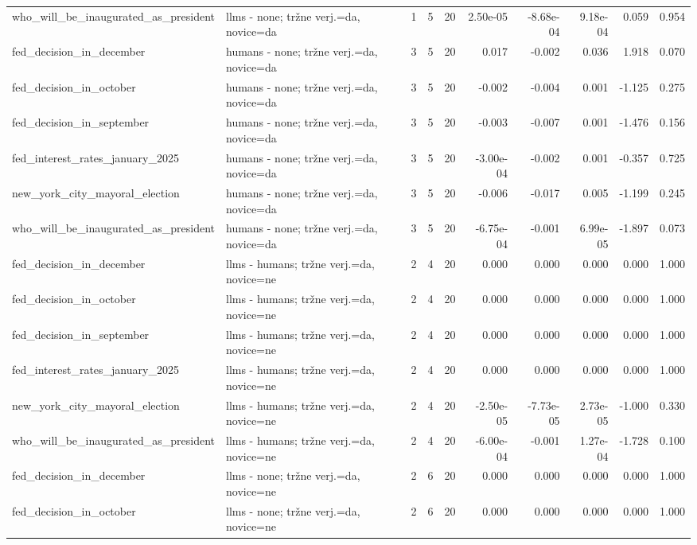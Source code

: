 \begin{longtable}{llrrrrrrrr}
who\_will\_be\_inaugurated\_as\_president & llms - none; tržne verj.=da, novice=da & 1 & 5 & 20 & 2.50e-05 & -8.68e-04 & 9.18e-04 & 0.059 & 0.954 \\
fed\_decision\_in\_december & humans - none; tržne verj.=da, novice=da & 3 & 5 & 20 & 0.017 & -0.002 & 0.036 & 1.918 & 0.070 \\
fed\_decision\_in\_october & humans - none; tržne verj.=da, novice=da & 3 & 5 & 20 & -0.002 & -0.004 & 0.001 & -1.125 & 0.275 \\
fed\_decision\_in\_september & humans - none; tržne verj.=da, novice=da & 3 & 5 & 20 & -0.003 & -0.007 & 0.001 & -1.476 & 0.156 \\
fed\_interest\_rates\_january\_2025 & humans - none; tržne verj.=da, novice=da & 3 & 5 & 20 & -3.00e-04 & -0.002 & 0.001 & -0.357 & 0.725 \\
new\_york\_city\_mayoral\_election & humans - none; tržne verj.=da, novice=da & 3 & 5 & 20 & -0.006 & -0.017 & 0.005 & -1.199 & 0.245 \\
who\_will\_be\_inaugurated\_as\_president & humans - none; tržne verj.=da, novice=da & 3 & 5 & 20 & -6.75e-04 & -0.001 & 6.99e-05 & -1.897 & 0.073 \\
fed\_decision\_in\_december & llms - humans; tržne verj.=da, novice=ne & 2 & 4 & 20 & 0.000 & 0.000 & 0.000 & 0.000 & 1.000 \\
fed\_decision\_in\_october & llms - humans; tržne verj.=da, novice=ne & 2 & 4 & 20 & 0.000 & 0.000 & 0.000 & 0.000 & 1.000 \\
fed\_decision\_in\_september & llms - humans; tržne verj.=da, novice=ne & 2 & 4 & 20 & 0.000 & 0.000 & 0.000 & 0.000 & 1.000 \\
fed\_interest\_rates\_january\_2025 & llms - humans; tržne verj.=da, novice=ne & 2 & 4 & 20 & 0.000 & 0.000 & 0.000 & 0.000 & 1.000 \\
new\_york\_city\_mayoral\_election & llms - humans; tržne verj.=da, novice=ne & 2 & 4 & 20 & -2.50e-05 & -7.73e-05 & 2.73e-05 & -1.000 & 0.330 \\
who\_will\_be\_inaugurated\_as\_president & llms - humans; tržne verj.=da, novice=ne & 2 & 4 & 20 & -6.00e-04 & -0.001 & 1.27e-04 & -1.728 & 0.100 \\
fed\_decision\_in\_december & llms - none; tržne verj.=da, novice=ne & 2 & 6 & 20 & 0.000 & 0.000 & 0.000 & 0.000 & 1.000 \\
fed\_decision\_in\_october & llms - none; tržne verj.=da, novice=ne & 2 & 6 & 20 & 0.000 & 0.000 & 0.000 & 0.000 & 1.000 \\

\end{longtable}

